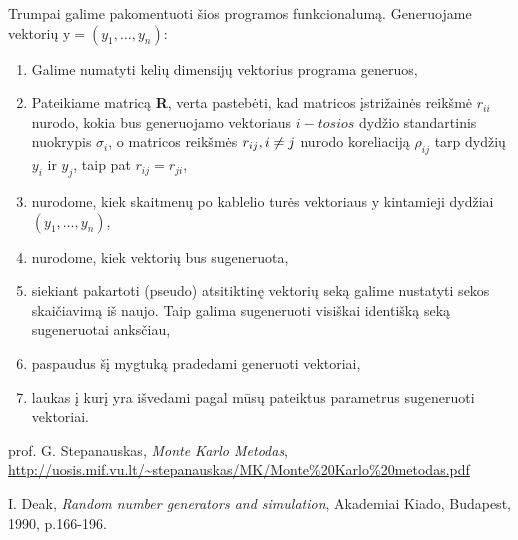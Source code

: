 \documentclass[12pt]{article}
\begin{document}
Trumpai galime pakomentuoti šios programos funkcionalumą.
Generuojame vektorių $\mathrm{y}=(y_1, \ldots, y_n)$:
\begin{enumerate}
	\item Galime numatyti kelių dimensijų vektorius programa generuos,
	
	\item Pateikiame matricą {\bf R}, verta pastebėti, kad matricos įstrižainės reikšmė $r_{ii}$ nurodo, kokia bus generuojamo vektoriaus $i-tosios$ dydžio standartinis nuokrypis $\sigma_i$, o matricos reikšmės $r_{ij}, \space i \neq j$ nurodo koreliaciją $\rho_{ij}$ tarp dydžių $y_i$ ir $y_j$, taip pat $r_{ij} = r_{ji}$,
	
	\item nurodome, kiek skaitmenų po kablelio turės vektoriaus $\mathrm{y}$ kintamieji dydžiai $(y_1, \ldots, y_n)$,
	
	\item nurodome, kiek vektorių bus sugeneruota,
	
	\item siekiant pakartoti (pseudo) atsitiktinę vektorių seką galime nustatyti sekos skaičiavimą iš naujo. Taip galima sugeneruoti visiškai identišką seką sugeneruotai anksčiau,
	
	\item paspaudus šį mygtuką pradedami generuoti vektoriai,
	
	\item laukas į kurį yra išvedami pagal mūsų pateiktus parametrus sugeneruoti vektoriai.
\end{enumerate}

\newpage

\begin{thebibliography}{99}
	prof. G. Stepanauskas, \textit{Monte Karlo Metodas}, \url{http://uosis.mif.vu.lt/~stepanauskas/MK/Monte%20Karlo%20metodas.pdf} 
	
	I. Deak, \textit{Random number generators and simulation}, Akademiai Kiado, Budapest, 1990, p.166-196.
	
\end{thebibliography} 
\end{document}
